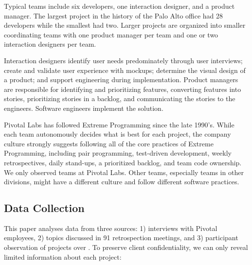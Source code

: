 Typical teams include six developers, one interaction designer, and a product manager. The largest project in the history of the Palo Alto office had 28 developers while the smallest had two. Larger projects are organized into smaller coordinating teams with one product manager per team and one or two interaction designers per team.

Interaction designers identify user needs predominately through user interviews; create and validate user experience with mockups; determine the visual design of a product; and support engineering during implementation. Product managers are responsible for identifying and prioritizing features, converting features into stories, prioritizing stories in a backlog, and communicating the stories to the engineers. Software engineers implement the solution. 

Pivotal Labs has followed Extreme Programming \cite{BeckExtremeProgramming2004} since the late 1990's. While each team autonomously decides what is best for each project, the company culture strongly suggests following all of the core practices of Extreme Programming, including pair programming, test-driven development, weekly retrospectives, daily stand-ups, a prioritized backlog, and team code ownership. We only observed teams at Pivotal Labs. Other teams, especially teams in other divisions, might have a different culture and follow different software practices.

\subsection{Data Collection}
This paper analyses data from three sources: 1) interviews with Pivotal employees, 2) topics discussed in 91 retrospection meetings, and 3) participant observation of \numberOfObservedProjects{} projects over \durationOfResearchStudyPlural{}. To preserve client confidentiality, we can only reveal limited information about each project:

